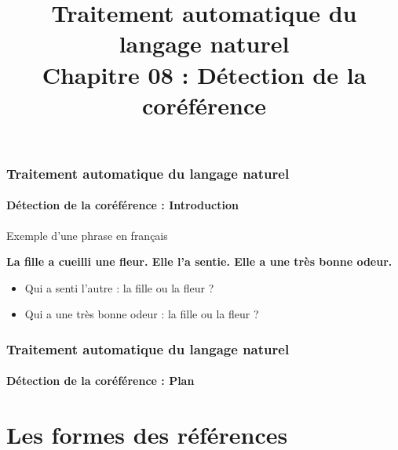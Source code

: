 \documentclass[xcolor=table]{beamer}
\title[TALN : 08- Détection de la coréférence]%
{Traitement automatique du langage naturel\\Chapitre 08 : Détection de la coréférence}
\begin{document}
	
\begin{frame}
\frametitle{Traitement automatique du langage naturel}
\framesubtitle{Détection de la coréférence : Introduction}

\begin{exampleblock}{Exemple d'une phrase en français}
	\begin{center}
		\Large\bfseries
	La fille a cueilli une fleur. Elle l'a sentie. Elle a une très bonne odeur.
	\end{center}
\end{exampleblock}

\begin{itemize}
	\item Qui a senti l'autre : la fille ou la fleur ?
	\item Qui a une très bonne odeur : la fille ou la fleur ?
\end{itemize}

\end{frame}

%
%

\begin{frame}
\frametitle{Traitement automatique du langage naturel}
\framesubtitle{Détection de la coréférence : Plan}

\begin{multicols}{2}
\tableofcontents
\end{multicols}
\end{frame}

\section{Les formes des références}
\end{document}
